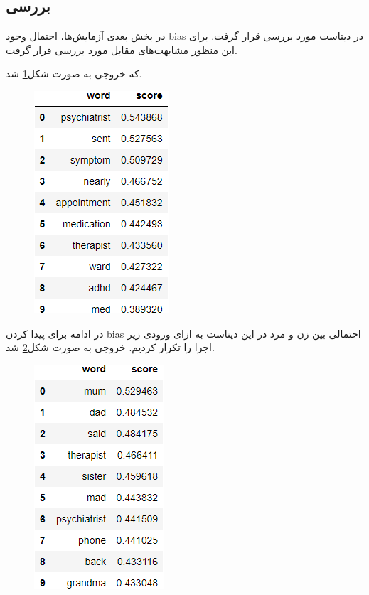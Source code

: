 \documentclass[10pt]{article}
\begin{document}
\subsection{بررسی
}
در بخش بعدی آزمایش‌ها، احتمال وجود bias در دیتاست مورد بررسی قرار گرفت.
برای این منظور مشابهت‌های مقابل مورد بررسی قرار گرفت.
\begin{flushleft}
\end{flushleft}

که خروجی به صورت شکل\ref{word2vec-man} شد.

	
\begin{figure}[H]
		\centering\includegraphics[width=0.3\linewidth]{../reports/word2vec/bias-man.png}
		\caption{ 
			}
		\label{word2vec-man}
	\end{figure}
در ادامه برای پیدا کردن bias احتمالی بین زن و مرد در این دیتاست به ازای ورودی زیر اجرا را تکرار کردیم. خروجی به صورت شکل\ref{word2vec-woman} شد. 
\begin{flushleft}
\end{flushleft}

	\begin{figure}[H]
	\centering\includegraphics[width=0.3\linewidth]{../reports/word2vec/bias-woman.png}
	\caption{ 
		}
	\label{word2vec-woman}
	\end{figure}
\end{document}
